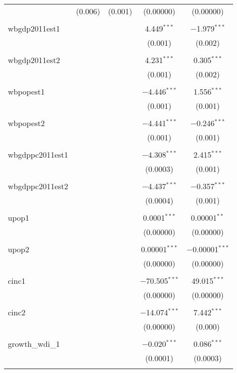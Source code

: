 \begin{table}[!htbp]
\begin{tabular}{@{\extracolsep{5pt}}lcccc}
  & (0.006) & (0.001) & (0.00000) & (0.00000) \\ 
  & & & & \\ 
 wbgdp2011est1 &  &  & 4.449$^{***}$ & $-$1.979$^{***}$ \\ 
  &  &  & (0.001) & (0.002) \\ 
  & & & & \\ 
 wbgdp2011est2 &  &  & 4.231$^{***}$ & 0.305$^{***}$ \\ 
  &  &  & (0.001) & (0.002) \\ 
  & & & & \\ 
 wbpopest1 &  &  & $-$4.446$^{***}$ & 1.556$^{***}$ \\ 
  &  &  & (0.001) & (0.001) \\ 
  & & & & \\ 
 wbpopest2 &  &  & $-$4.441$^{***}$ & $-$0.246$^{***}$ \\ 
  &  &  & (0.001) & (0.001) \\ 
  & & & & \\ 
 wbgdppc2011est1 &  &  & $-$4.308$^{***}$ & 2.415$^{***}$ \\ 
  &  &  & (0.0003) & (0.001) \\ 
  & & & & \\ 
 wbgdppc2011est2 &  &  & $-$4.437$^{***}$ & $-$0.357$^{***}$ \\ 
  &  &  & (0.0004) & (0.001) \\ 
  & & & & \\ 
 upop1 &  &  & 0.0001$^{***}$ & 0.00001$^{**}$ \\ 
  &  &  & (0.00000) & (0.00000) \\ 
  & & & & \\ 
 upop2 &  &  & 0.00001$^{***}$ & $-$0.00001$^{***}$ \\ 
  &  &  & (0.00000) & (0.00000) \\ 
  & & & & \\ 
 cinc1 &  &  & $-$70.505$^{***}$ & 49.015$^{***}$ \\ 
  &  &  & (0.00000) & (0.00000) \\ 
  & & & & \\ 
 cinc2 &  &  & $-$14.074$^{***}$ & 7.442$^{***}$ \\ 
  &  &  & (0.00000) & (0.000) \\ 
  & & & & \\ 
 growth\_wdi\_1 &  &  & $-$0.020$^{***}$ & 0.086$^{***}$ \\ 
  &  &  & (0.0001) & (0.0003) \\ 
  & & & & \\ 

\end{tabular}
\end{table}
